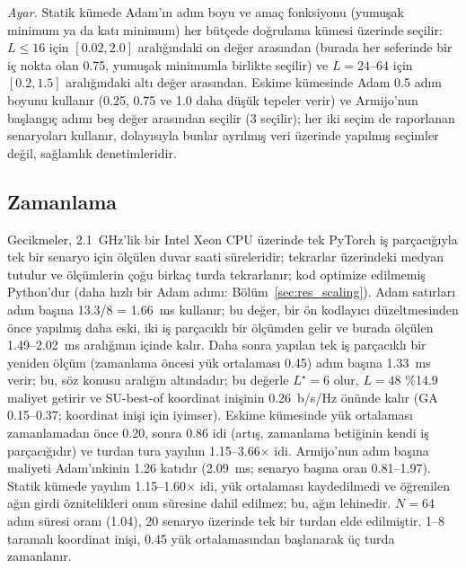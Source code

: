 \emph{Ayar.} Statik kümede Adam'ın adım boyu ve amaç fonksiyonu (yumuşak minimum ya da katı minimum) her bütçede doğrulama kümesi üzerinde seçilir: $L\le 16$ için $[0.02, 2.0]$ aralığındaki on değer arasından (burada her seferinde bir iç nokta olan 0.75, yumuşak minimumla birlikte seçilir) ve $L=24$--$64$ için $[0.2, 1.5]$ aralığındaki altı değer arasından. Eskime kümesinde Adam 0.5 adım boyunu kullanır (0.25, 0.75 ve 1.0 daha düşük tepeler verir) ve Armijo'nun başlangıç adımı beş değer arasından seçilir (3 seçilir); her iki seçim de raporlanan senaryoları kullanır, dolayısıyla bunlar ayrılmış veri üzerinde yapılmış seçimler değil, sağlamlık denetimleridir.

\subsection{Zamanlama}
Gecikmeler, 2.1~GHz'lik bir Intel Xeon CPU üzerinde tek PyTorch iş parçacığıyla tek bir senaryo için ölçülen duvar saati süreleridir; tekrarlar üzerindeki medyan tutulur ve ölçümlerin çoğu birkaç turda tekrarlanır; kod optimize edilmemiş Python'dur (daha hızlı bir Adam adımı: Bölüm~\ref{sec:res_scaling}). Adam satırları adım başına 13.3/8 = 1.66~ms kullanır; bu değer, bir ön kodlayıcı düzeltmesinden önce yapılmış daha eski, iki iş parçacıklı bir ölçümden gelir ve burada ölçülen 1.49--2.02~ms aralığının içinde kalır. Daha sonra yapılan tek iş parçacıklı bir yeniden ölçüm (zamanlama öncesi yük ortalaması 0.45) adım başına 1.33~ms verir; bu, söz konusu aralığın altındadır; bu değerle $L^\star=6$ olur, $L=48$ \%14.9 maliyet getirir ve SU-best-of koordinat inişinin 0.26~b/s/Hz önünde kalır (GA 0.15--0.37; koordinat inişi için iyimser). Eskime kümesinde yük ortalaması zamanlamadan önce 0.20, sonra 0.86 idi (artış, zamanlama betiğinin kendi iş parçacığıdır) ve turdan tura yayılım 1.15--3.66$\times$ idi. Armijo'nun adım başına maliyeti Adam'ınkinin 1.26 katıdır (2.09~ms; senaryo başına oran 0.81--1.97). Statik kümede yayılım 1.15--1.60$\times$ idi, yük ortalaması kaydedilmedi ve öğrenilen ağın girdi öznitelikleri onun süresine dahil edilmez; bu, ağın lehinedir. $N=64$ adım süresi oranı (1.04), 20 senaryo üzerinde tek bir turdan elde edilmiştir. 1--8 taramalı koordinat inişi, 0.45 yük ortalamasından başlanarak üç turda zamanlanır.

